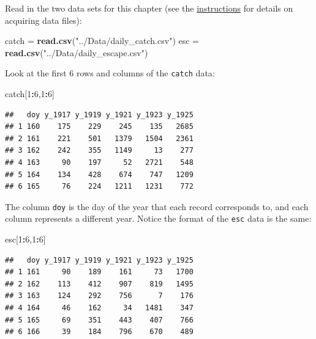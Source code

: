 \documentclass[]{book}
\newenvironment{Shaded}{\begin{snugshade}}{\end{snugshade}}
\newcommand{\DecValTok}[1]{\textcolor[rgb]{0.00,0.00,0.81}{#1}}
\newcommand{\KeywordTok}[1]{\textcolor[rgb]{0.13,0.29,0.53}{\textbf{#1}}}
\newcommand{\NormalTok}[1]{#1}
\newcommand{\OperatorTok}[1]{\textcolor[rgb]{0.81,0.36,0.00}{\textbf{#1}}}
\newcommand{\StringTok}[1]{\textcolor[rgb]{0.31,0.60,0.02}{#1}}
\begin{document}
Read in the two data sets for this chapter (see the \protect\hyperlink{data-sets}{instructions} for details on acquiring data files):

\begin{Shaded}
\begin{Highlighting}[]
\NormalTok{catch =}\StringTok{ }\KeywordTok{read.csv}\NormalTok{(}\StringTok{"../Data/daily_catch.csv"}\NormalTok{)}
\NormalTok{esc =}\StringTok{ }\KeywordTok{read.csv}\NormalTok{(}\StringTok{"../Data/daily_escape.csv"}\NormalTok{)}
\end{Highlighting}
\end{Shaded}

Look at the first 6 rows and columns of the \texttt{catch} data:

\begin{Shaded}
\begin{Highlighting}[]
\NormalTok{catch[}\DecValTok{1}\OperatorTok{:}\DecValTok{6}\NormalTok{,}\DecValTok{1}\OperatorTok{:}\DecValTok{6}\NormalTok{]}
\end{Highlighting}
\end{Shaded}

\begin{verbatim}
##   doy y_1917 y_1919 y_1921 y_1923 y_1925
## 1 160    175    229    245    135   2685
## 2 161    221    501   1379   1504   2361
## 3 162    242    355   1149     13    277
## 4 163     90    197     52   2721    548
## 5 164    134    428    674    747   1209
## 6 165     76    224   1211   1231    772
\end{verbatim}

The column \texttt{doy} is the day of the year that each record corresponds to, and each column represents a different year. Notice the format of the \texttt{esc} data is the same:

\begin{Shaded}
\begin{Highlighting}[]
\NormalTok{esc[}\DecValTok{1}\OperatorTok{:}\DecValTok{6}\NormalTok{,}\DecValTok{1}\OperatorTok{:}\DecValTok{6}\NormalTok{]}
\end{Highlighting}
\end{Shaded}

\begin{verbatim}
##   doy y_1917 y_1919 y_1921 y_1923 y_1925
## 1 161     90    189    161     73   1700
## 2 162    113    412    907    819   1495
## 3 163    124    292    756      7    176
## 4 164     46    162     34   1481    347
## 5 165     69    351    443    407    766
## 6 166     39    184    796    670    489
\end{verbatim}
\end{document}
